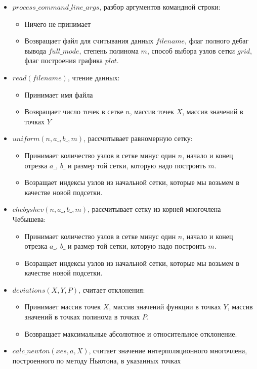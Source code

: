 \documentclass[paper=a4, fontsize=11pt]{scrartcl} %
\numberwithin{equation}{section} %
\numberwithin{figure}{section} %
\numberwithin{table}{section} %
\begin{document}
\begin{itemize}
	\item $process\_command\_line\_args$, разбор аргументов командной строки:
		\begin{itemize}
		\item Ничего не принимает
		\item Возвращает файл для считывания данных $filename$, флаг полного дебаг вывода $full\_mode$, степень полинома $m$, способ выбора узлов сетки $grid$, флаг построения графика $plot$.
		\end{itemize}
	\item $read(filename)$, чтение данных:
		\begin{itemize}
		\item Принимает имя файла
		\item Возвращает число точек в сетке $n$, массив точек $X$, массив значений в точках $Y$
		\end{itemize}
	\item $uniform(n, a\_, b\_, m)$, рассчитывает равномерную сетку:
		\begin{itemize}
		\item Принимает количество узлов в сетке минус один $n$, начало и конец отрезка $a\_$, $b\_$ и размер той сетки, которую надо построить $m$.
		\item Возращает индексы узлов из начальной сетки, которые мы возьмем в качестве новой подсетки.
		\end{itemize}
	\item $chebyshev(n, a\_, b\_, m)$, рассчитывает сетку из корней многочлена Чебышева:
		\begin{itemize}
		\item Принимает количество узлов в сетке минус один $n$, начало и конец отрезка $a\_$, $b\_$ и размер той сетки, которую надо построить $m$.
		\item Возращает индексы узлов из начальной сетки, которые мы возьмем в качестве новой подсетки.
		\end{itemize}
    \item $deviations(X, Y, P)$, считает отклонения:
        \begin{itemize}
		\item Принимает массив точек $X$, массив значений функции в точках $Y$, массив значений в точках полинома в точках $P$.
		\item Возвращает максимальные абсолютное и относительное отклонение.
		\end{itemize}
	\item $calc\_newton(xes, a, X)$, считает значение интерполяционного многочлена, построенного по методу Ньютона, в указанных точках

\end{itemize}
\end{document}
